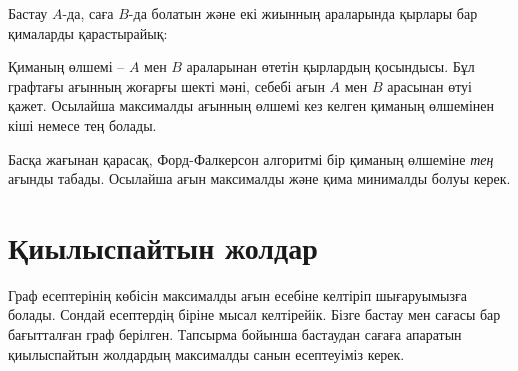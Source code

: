 Бастау $A$-да, саға $B$-да болатын
және екі жиынның араларында қырлары 
бар қималарды қарастырайық:


\begin{center}
\end{center}

Қиманың өлшемі -- $A$ мен $B$ араларынан өтетін
қырлардың қосындысы. Бұл графтағы ағынның жоғарғы шекті 
мәні, себебі ағын $A$ мен $B$ арасынан өтуі қажет. 
Осылайша максималды ағынның өлшемі 
кез келген қиманың өлшемінен
кіші немесе тең болады.

Басқа жағынан қарасақ, Форд-Фалкерсон алгоритмі 
бір қиманың өлшеміне \emph{тең} ағынды табады. 
Осылайша ағын максималды және
қима минималды болуы керек. 


\section{Қиылыспайтын жолдар}

Граф есептерінің көбісін максималды ағын есебіне
келтіріп шығаруымызға болады. Сондай есептердің 
біріне мысал келтірейік. Бізге бастау мен сағасы бар 
бағытталған граф берілген. Тапсырма бойынша бастаудан сағаға апаратын
қиылыспайтын жолдардың максималды санын 
есептеуіміз керек. 


